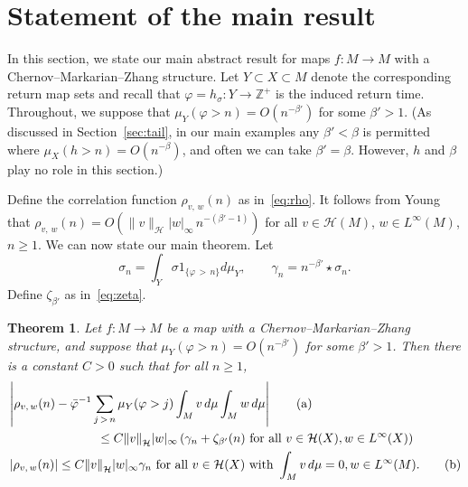 \documentclass[10pt]{amsart}
\newtheorem{theo}{Theorem}[section]
\theoremstyle{definition}\newtheorem{defi}[theo]{Definition}\newtheorem{rema}[theo]{Remark}\newtheorem{exam}[theo]{Example}\newtheorem{exem}[theo]{Example}\newtheorem{nota}[theo]{Notation}
\newcommand{\Z}{\mathbb{Z}}
\newcommand{\cH}{\mathcal{H}}
\newcommand{\bvarphi}{\bar{\varphi}}
\newcommand*{\alphenumi}{\renewcommand*{\theenumi}{\alph{enumi}}}
\begin{document}
\section{Statement of the main result}\label{sec:main}

In this section, we state our main abstract result for maps $f:M\to M$ with a Chernov--Markarian--Zhang structure. Let $Y\subset X\subset M$ denote the corresponding return map sets and recall that $\varphi=h_\sigma:Y\to\Z^+$ is the induced return time. Throughout, we suppose that $\mu_Y(\varphi>n)=O(n^{-\beta'})$ for some $\beta'>1$. (As discussed in Section~\ref{sec:tail}, in our main examples any $\beta'<\beta$ is permitted where $\mu_X(h>n)=O(n^{-\beta})$, and often we can take $\beta'=\beta$. However, $h$ and $\beta$ play no role in this section.)



Define the correlation function $\rho_{v,\,w}(n)$ as in~\eqref{eq:rho}. It follows from Young~\cite{Young99} that $\rho_{v,\,w}(n)=O(\|v\|_\cH |w|_\infty\, n^{-(\beta'-1)})$ for all $v\in\cH(M)$, $w\in L^\infty(M)$, $n\ge1$. We can now state our main theorem. Let
\begin{equation}\label{eq:gamma}
 \sigma_n= \int_Y \sigma 1_{\{\varphi\,>\,n\}}d\mu_Y, \qquad
\gamma_n=n^{-\beta'}\star \sigma_n.
\end{equation}
Define $\zeta_{\beta'}$ as in~\eqref{eq:zeta}.


\begin{theo} \label{thm:main}
Let $f:M\to M$ be a map with a Chernov--Markarian--Zhang structure, and suppose that $\mu_Y(\varphi>n)=O(n^{-\beta'})$ for some $\beta'>1$. Then there is a constant $C>0$ such that for all $n\ge1$,
\begin{align}
&\left|\rho_{v,\,w}(n)-\bvarphi^{-1}\sum_{j\,>\,n} \mu_Y(\varphi>j)\int_Mv\,d\mu\int_Mw\,d\mu\right|\tag{${\rm a}$}\label{theo3.1.1}
\\
&\mkern130mu\le C{\|v\|}_{\cH}|w|_\infty\left(\gamma_n+\zeta_{\beta'}(n)\text{ for all }v\in \cH(X), w\in L^\infty(X)\right)\nonumber\\
 &\left|\rho_{v,\,w}(n)\right|\le C{\|v\|}_{\cH}|w|_\infty\gamma_n\text{ for all }v\in \cH(X)\text{ with }\int_M v\,d\mu=0, w\in L^\infty(M).\tag{${\rm b}$}\label{theo3.1.2}
\end{align}
\end{theo}
\end{document}

